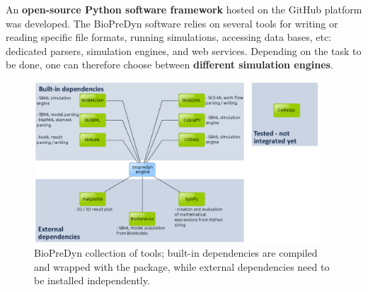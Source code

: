 \documentclass[17pt,portrait,a1,usenames,dvipsnames,plainboxedsections]{sciposter}
\begin{document}
\begin{multicols}{2}
An {\bf open-source Python software framework} hosted on the GitHub platform
was developed. The BioPreDyn software relies on several tools for writing or
reading specific file formats, running simulations, accessing data bases, etc:
dedicated parsers, simulation engines, and web services. Depending on the task
to be done, one can therefore choose between {\bf different simulation
engines}.

\begin{figure}
\centering
\includegraphics[width=0.95\textwidth]{biopredyn_modules_3.pdf}
\caption{BioPreDyn collection of tools; built-in dependencies are compiled
and wrapped with the package, while external dependencies need to be
installed independently.}
\end{figure}


\end{multicols}
\end{document}
